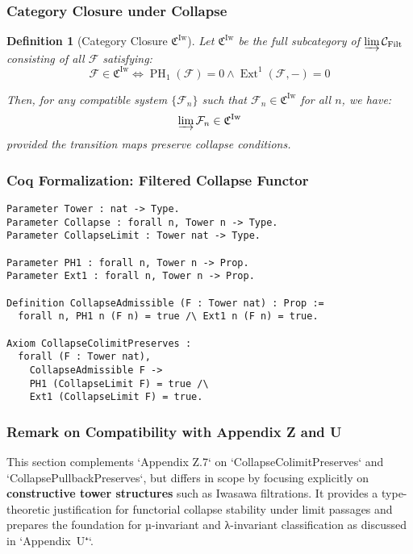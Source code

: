 \documentclass[11pt]{article}
\newtheorem{definition}[theorem]{Definition}
\DeclareMathOperator{\Ext}{Ext}
\DeclareMathOperator{\PH}{PH}
\begin{document}
\subsubsection*{Category Closure under Collapse}

\begin{definition}[Category Closure $\mathfrak{C}^{\mathrm{Iw}}$]
Let $\mathfrak{C}^{\mathrm{Iw}}$ be the full subcategory of $\varinjlim \mathcal{C}_{\mathrm{Filt}}$ consisting of all $\mathcal{F}$ satisfying:
\[
\mathcal{F} \in \mathfrak{C}^{\mathrm{Iw}} \iff \PH_1(\mathcal{F}) = 0 \land \Ext^1(\mathcal{F}, -) = 0
\]

Then, for any compatible system $\{ \mathcal{F}_n \}$ such that $\mathcal{F}_n \in \mathfrak{C}^{\mathrm{Iw}}$ for all $n$, we have:
\[
\varinjlim \mathcal{F}_n \in \mathfrak{C}^{\mathrm{Iw}}
\]
provided the transition maps preserve collapse conditions.
\end{definition}

\subsubsection*{Coq Formalization: Filtered Collapse Functor}

\begin{lstlisting}[language=Coq, caption=Collapse Functor over Filtered Colimits]
Parameter Tower : nat -> Type.
Parameter Collapse : forall n, Tower n -> Type.
Parameter CollapseLimit : Tower nat -> Type.

Parameter PH1 : forall n, Tower n -> Prop.
Parameter Ext1 : forall n, Tower n -> Prop.

Definition CollapseAdmissible (F : Tower nat) : Prop :=
  forall n, PH1 n (F n) = true /\ Ext1 n (F n) = true.

Axiom CollapseColimitPreserves :
  forall (F : Tower nat),
    CollapseAdmissible F ->
    PH1 (CollapseLimit F) = true /\
    Ext1 (CollapseLimit F) = true.
\end{lstlisting}

\subsubsection*{Remark on Compatibility with Appendix Z and U}

This section complements `Appendix Z.7` on `CollapseColimitPreserves` and `CollapsePullbackPreserves`, but differs in scope by focusing explicitly on \textbf{constructive tower structures} such as Iwasawa filtrations. It provides a type-theoretic justification for functorial collapse stability under limit passages and prepares the foundation for µ-invariant and λ-invariant classification as discussed in `Appendix~U⁺`.
\end{document}
